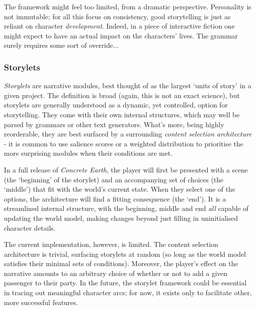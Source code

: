 \documentclass[a4paper, 11pt]{article}
\begin{document}
\begin{flushleft}
\vspace{5pt}\noindent
The framework might feel too limited, from a dramatic perspective. Personality is not immutable; for all this focus on consistency, good storytelling is just as reliant on character \textit{development}. Indeed, in a piece of interactive fiction one might expect to have an actual impact on the characters' lives. The grammar surely requires some sort of override...

\subsubsection{Storylets} 

\textit{Storylets} \citep{kreminskiStorylets} are narrative modules, best thought of as the largest `units of story' in a given project. The definition is broad (again, this is not an exact science), but storylets are generally understood as a dynamic, yet controlled, option for storytelling. They come with their own internal structures, which may well be parsed by grammars or other text generators. What's more, being highly reorderable, they are best surfaced by a surrounding \textit{content selection architecture} - it is common to use salience scores or a weighted distribution to prioritise the more surprising modules when their conditions are met.

\vspace{5pt}\noindent
In a full release of \textit{Concrete Earth}, the player will first be presented with a scene (the `beginning' of the storylet) and an accompanying set of choices (the `middle') that fit with the world's current state. When they select one of the options, the architecture will find a fitting consequence (the `end'). It is a streamlined internal structure, with the beginning, middle and end \textit{all} capable of updating the world model, making changes beyond just filling in uninitialised character details.
 
\newpage\noindent
The current implementation, however, is limited. The content selection architecture is trivial, surfacing storylets at random (so long as the world model satisfies their minimal sets of conditions). Moreover, the player's effect on the narrative amounts to an arbitrary choice of whether or not to add a given passenger to their party. In the future, the storylet framework could be essential in tracing out meaningful character arcs; for now, it exists only to facilitate other, more successful features.


\end{flushleft}
\end{document}
